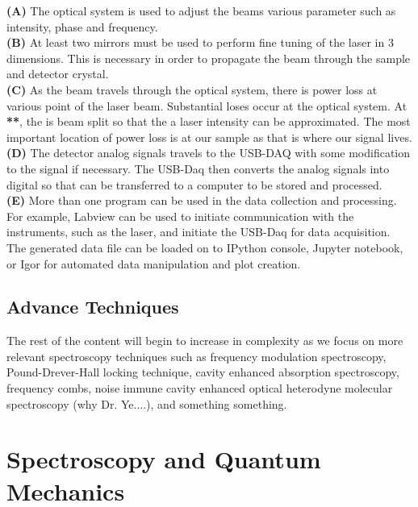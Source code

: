 \documentclass[11pt,a4paper]{book}
\begin{document}
		\noindent
		{\bfseries (A)} The optical system is used to adjust the beams various parameter such as intensity, phase and frequency.\\
		{\bfseries (B)} At least two mirrors must be used to perform fine tuning of the laser in 3 dimensions. This is necessary in order to propagate the beam through the sample and detector crystal. \\
		{\bfseries (C)} As the beam travels through the optical system, there is power loss at various point of the laser beam. Substantial loses occur at the optical system. At\\ {\bfseries ***}, the is beam split so that the a laser intensity can be approximated. The most important location of power loss is at our sample as that is where our signal lives.\\
		{\bfseries(D)} The detector analog signals travels to the USB-DAQ with some modification to the signal if necessary. The USB-Daq then converts the analog signals into digital so that can be transferred to a computer to be stored and processed. \\
		{\bfseries(E)} More than one program can be used in the data collection and processing. For example, Labview can be used to initiate communication with the instruments, such as the laser, and initiate the USB-Daq for data acquisition. The generated data file can be loaded on to IPython console, Jupyter notebook, or Igor for automated data manipulation and plot creation.		
	
	\section{Advance Techniques}
		\label{sec:Advance Techniques}
		The rest of the content will begin to increase in complexity as we focus on more relevant spectroscopy techniques such as frequency modulation spectroscopy, Pound-Drever-Hall locking technique, cavity enhanced absorption spectroscopy, frequency combs, noise immune cavity enhanced optical heterodyne molecular spectroscopy (why Dr. Ye....), and something something.

\chapter{Spectroscopy and Quantum Mechanics}
	\label{chp:Spectroscopy}
	
\end{document}
